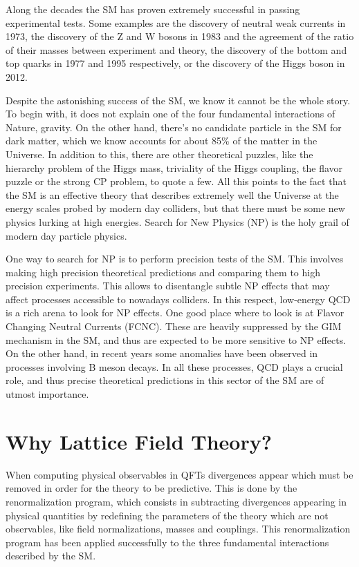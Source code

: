 Along the decades the SM has proven extremely successful in passing experimental tests. Some examples are the discovery of neutral weak currents in 1973, the discovery of the Z and W bosons in 1983 and the agreement of the ratio of their masses between experiment and theory, the discovery of the bottom and top quarks in 1977 and 1995 respectively, or the discovery of the Higgs boson in 2012. 

Despite the astonishing success of the SM, we know it cannot be the whole story. To begin with, it does not explain one of the four fundamental interactions of Nature, gravity. On the other hand, there's no candidate particle in the SM for dark matter, which we know accounts for about 85\% of the matter in the Universe. In addition to this, there are other theoretical puzzles, like the hierarchy problem of the Higgs mass, triviality of the Higgs coupling, the flavor puzzle or the strong CP problem, to quote a few. All this points to the fact that the SM is an effective theory that describes extremely well the Universe at the energy scales probed by modern day colliders, but that there must be some new physics lurking at high energies. Search for New Physics (NP) is the holy grail of modern day particle physics. 

One way to search for NP is to perform precision tests of the SM. This involves making high precision theoretical predictions and comparing them to high precision experiments. This allows to disentangle subtle NP effects that may affect processes accessible to nowadays colliders. In this respect, low-energy QCD is a rich arena to look for NP effects. One good place where to look is at Flavor Changing Neutral Currents (FCNC). These are heavily suppressed by the GIM mechanism in the SM, and thus are expected to be more sensitive to NP effects. On the other hand, in recent years some anomalies have been observed in processes involving B meson decays. In all these processes, QCD plays a crucial role, and thus precise theoretical predictions in this sector of the SM are of utmost importance.

\section*{Why Lattice Field Theory?}

When computing physical observables in QFTs divergences appear which must be removed in order for the theory to be predictive. This is done by the renormalization program, which consists in subtracting divergences appearing in physical quantities by redefining the parameters of the theory which are not observables, like field normalizations, masses and couplings. This renormalization program has been applied successfully to the three fundamental interactions described by the SM.

